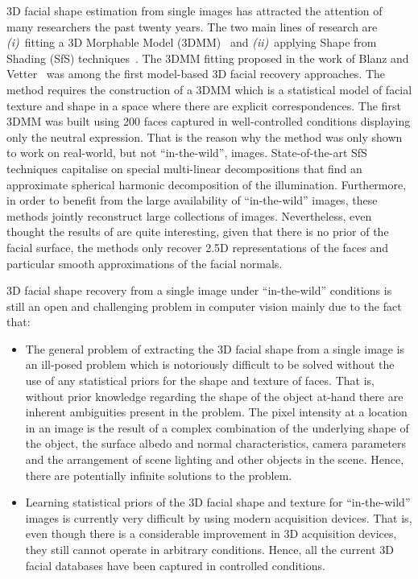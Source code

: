 3D facial shape estimation from single images has attracted the attention of
many researchers the past twenty years. The two main lines of research are \emph{(i)}~fitting a 3D Morphable Model
(3DMM)~\cite{blanz1999morphable,blanz2003face} and \emph{(ii)}~applying Shape from Shading (SfS) techniques~\cite{snape2015automatic,snape2014kernel,kemelmacher2013internet}.
The 3DMM fitting proposed in the work of
Blanz and Vetter~\cite{blanz1999morphable,blanz2003face} was among the first model-based 3D
facial recovery approaches. The method requires the construction of a 3DMM which
is a statistical model of facial texture and shape in a space where there are
explicit correspondences. The first 3DMM was built using 200 faces captured
in well-controlled conditions displaying only the neutral expression.
That is the reason why the method was only shown to work on real-world, but not ``in-the-wild'', images.
State-of-the-art SfS techniques capitalise on special multi-linear decompositions
that find an approximate spherical harmonic decomposition of the illumination.
Furthermore, in order to benefit from the large availability of ``in-the-wild'' images, these methods jointly reconstruct large collections of images. Nevertheless, even thought the results of \cite{snape2015automatic,kemelmacher2013internet} are quite interesting, given that there is no prior of the facial surface, the methods only recover 2.5D representations of the faces and particular smooth approximations of the facial normals.

3D facial shape recovery from a single image under ``in-the-wild'' conditions is still an open and challenging problem in computer vision mainly due to the fact that:
\begin{itemize}
\item The general problem of extracting the 3D facial shape from a single image
is an ill-posed problem which is notoriously difficult to be solved without the
use of any statistical priors for the shape and texture of faces. That is,
without prior knowledge regarding the shape of the object at-hand there are
inherent ambiguities present in the problem. The pixel intensity at a location
in an image is the result of a complex combination of the underlying shape of
the object, the surface albedo and normal characteristics, camera parameters
and the arrangement of scene lighting and other objects in the scene.
Hence, there are potentially infinite solutions to the problem.

\item Learning statistical priors of the 3D facial shape and texture for
``in-the-wild'' images is currently very difficult by using modern acquisition devices.
That is, even though there is a considerable improvement in 3D acquisition
devices, they still cannot operate in arbitrary conditions. Hence, all the
current 3D facial databases have been captured in controlled conditions.
\end{itemize}

